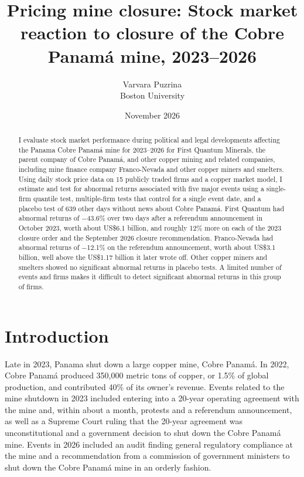 \documentclass[11pt]{article}
\title{Pricing mine closure: Stock market reaction to closure of the Cobre Panamá mine, 2023--2026}
\author{Varvara Puzrina\\ Boston University}
\date{November 2026}
\begin{document}
\maketitle

\begin{abstract}
\noindent I evaluate stock market performance during political and legal developments affecting the Panama Cobre Panamá mine for 2023--2026 for First Quantum Minerals, the parent company of Cobre Panamá, and other copper mining and related companies, including mine finance company Franco-Nevada and other copper miners and smelters. Using daily stock price data on 15 publicly traded firms and a copper market model, I estimate and test for abnormal returns associated with five major events using a single-firm quantile test, multiple-firm tests that control for a single event date, and a placebo test of 639 other days without news about Cobre Panamá. First Quantum had abnormal returns of $-$43.6\% over two days after a referendum announcement in October 2023, worth about US\$6.1 billion, and roughly 12\% more on each of the 2023 closure order and the September 2026 closure recommendation. Franco-Nevada had abnormal returns of $-$12.1\% on the referendum announcement, worth about US\$3.1 billion, well above the US\$1.17 billion it later wrote off. Other copper miners and smelters showed no significant abnormal returns in placebo tests. A limited number of events and firms makes it difficult to detect significant abnormal returns in this group of firms.
\end{abstract}

\section{Introduction}

Late in 2023, Panama shut down a large copper mine, Cobre Panamá. In 2022, Cobre Panamá produced 350,000 metric tons of copper, or 1.5\% of global production, and contributed 40\% of its owner's revenue. Events related to the mine shutdown in 2023 included entering into a 20-year operating agreement with the mine and, within about a month, protests and a referendum announcement, as well as a Supreme Court ruling that the 20-year agreement was unconstitutional and a government decision to shut down the Cobre Panamá mine. Events in 2026 included an audit finding general regulatory compliance at the mine and a recommendation from a commission of government ministers to shut down the Cobre Panamá mine in an orderly fashion.
\end{document}
